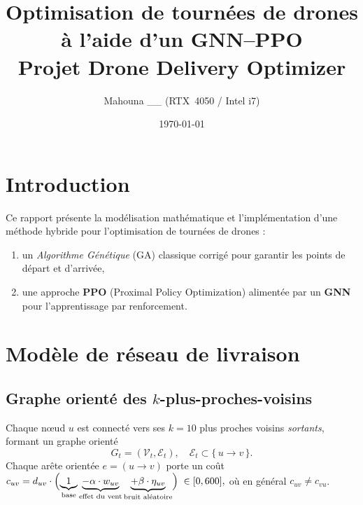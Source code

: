 \documentclass[11pt,a4paper]{article}
\title{\texorpdfstring{Optimisation de tournées de drones à l'aide d'un GNN--PPO\\\small Projet Drone Delivery Optimizer}{Optimisation de tournées de drones à l'aide d'un GNN-PPO - Projet Drone Delivery Optimizer}}
\author{\texorpdfstring{\small Mahouna \_\_ \quad (RTX~4050 / Intel i7)}{Mahouna __ (RTX 4050 / Intel i7)}}
\date{\today}
\begin{document}
\maketitle
\tableofcontents
\newpage

\section{Introduction}
Ce rapport présente la modélisation mathématique et l'implémentation d'une méthode hybride pour l'optimisation de tournées de drones : 
\begin{enumerate}
  \item un \emph{Algorithme Génétique} (GA) classique corrigé pour garantir les points de départ et d'arrivée,
  \item une approche \textbf{PPO} (Proximal Policy Optimization) alimentée par un \textbf{GNN} pour l'apprentissage par renforcement.
\end{enumerate}

\section{Modèle de réseau de livraison}

\subsection{Graphe orienté des \texorpdfstring{\(k\)}{k}-plus-proches-voisins}
Chaque nœud \(u\) est connecté vers ses \(k=10\) plus proches voisins \emph{sortants}, formant un graphe orienté 
\[
  G_t = (\mathcal{V}_t,\mathcal{E}_t),\quad \mathcal{E}_t\subset \{\,u\to v\,\}.
\]
Chaque arête orientée \(e=(u\!\to\!v)\) porte un coût 
\(
  c_{uv}
  = d_{uv} \cdot \Bigl(
  \underbrace{1}_{\text{base}}
  \underbrace{- \alpha \cdot w_{uv}}_{\text{effet du vent}}
  \underbrace{+ \beta \cdot \eta_{uv}}_{\text{bruit aléatoire}}
  \Bigr)
  \;\in[0,600],
\)
où en général \(c_{uv}\neq c_{vu}\).
\end{document}
